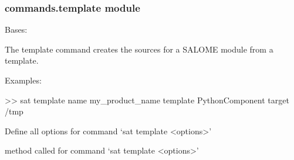 \documentclass[a4paper,10pt,english]{sphinxmanual}
\begin{document}
\subsubsection{commands.template module}
\label{\detokenize{apidoc_commands/commands:module-commands.template}}\label{\detokenize{apidoc_commands/commands:commands-template-module}}

\begin{fulllineitems}
\label{\detokenize{apidoc_commands/commands:commands.template.Command}}
Bases: 

The template command creates the sources for a SALOME module from a template.

\begin{DUlineblock}{0em}
\item[] Examples:
\item[] \textgreater{}\textgreater{} sat template \textendash{}name my\_product\_name \textendash{}template PythonComponent \textendash{}target /tmp
\end{DUlineblock}

\begin{fulllineitems}
\label{\detokenize{apidoc_commands/commands:commands.template.Command.getParser}}
Define all options for command ‘sat template \textless{}options\textgreater{}’

\end{fulllineitems}


\begin{fulllineitems}
\label{\detokenize{apidoc_commands/commands:commands.template.Command.name}}
\end{fulllineitems}


\begin{fulllineitems}
\label{\detokenize{apidoc_commands/commands:commands.template.Command.run}}
method called for command ‘sat template \textless{}options\textgreater{}’

\end{fulllineitems}


\end{fulllineitems}
\end{document}
